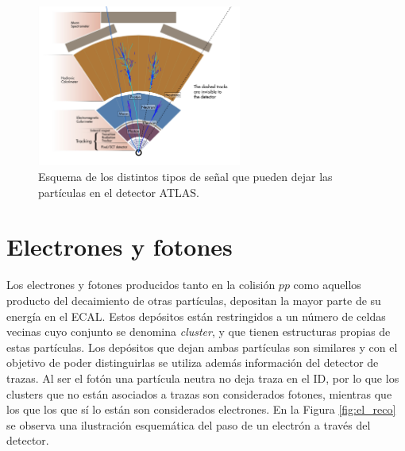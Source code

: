 \begin{figure}
\centering
  \includegraphics[width=0.6\textwidth]{images/objects/det_part.pdf}
\caption{Esquema de los distintos tipos de señal que pueden dejar las partículas en el detector ATLAS. 
}
\label{fig:particulasATLAS}
\end{figure}

\section{Electrones y fotones}\label{sec:ph_el}


Los electrones y fotones producidos tanto en la colisión $pp$ como aquellos producto del decaimiento de otras partículas, depositan la mayor parte de su energía en el ECAL. Estos depósitos están restringidos a un número de celdas vecinas cuyo conjunto se denomina \textit{cluster}, y que tienen estructuras propias de estas partículas. Los depósitos que dejan ambas partículas son similares y con el objetivo de poder distinguirlas se utiliza además información del detector de trazas. Al ser el fotón una partícula neutra no deja traza en el ID, por lo que los clusters que no están asociados a trazas son considerados fotones, mientras que los que los que sí lo están son considerados electrones. En la Figura \ref{fig:el_reco} se observa una ilustración esquemática del paso de un electrón a través del detector.

